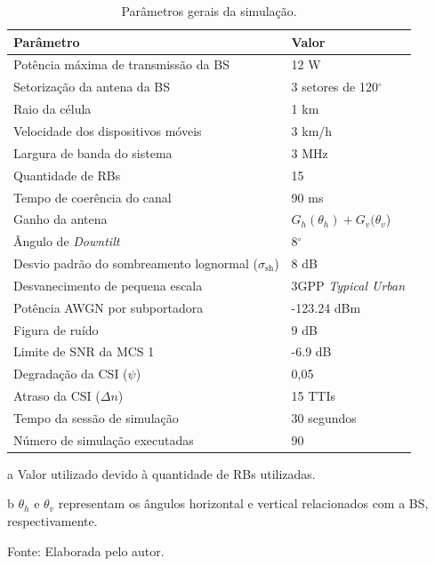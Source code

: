 \renewcommand{\arraystretch}{1}
\begin{table}[!ht]
	\centering
	\begin{threeparttable}[t]
		\caption{Parâmetros gerais da simulação.}
		\label{Tab:Gen_Simul_Param}
		\centering
		\tiny
		\begin{tabular}{l l}
			\toprule
			\textbf{Parâmetro} & \textbf{Valor}\\
			\midrule
			Potência máxima de transmissão da BS\tnote{a} & 12 W \cite{3gpp.36.814}\\
			\midrule
			Setorização da antena da BS & 3 setores de 120$^{\circ}$ \cite{3gpp.36.814}\\
			\midrule
			Raio da célula & 1 km\\
			\midrule
			Velocidade dos dispositivos móveis & 3 km/h \cite{3gpp.25.814}\\
			\midrule
			Largura de banda do sistema & 3 MHz \cite{Book:Pelcat2013}\\
			\midrule
			Quantidade de RBs & 15 \cite{Book:Pelcat2013}\\
			\midrule
			Tempo de coerência do canal & 90 ms\\
			\midrule
			Ganho da antena\tnote{b} & $G_{h}(\theta_{h}) + G_{v}(\theta_{v}$) \cite{Gunnarsson2008}\\
			\midrule
			Ângulo de \textit{Downtilt} & 8$^{\circ}$\\
			\midrule
			Desvio padrão do sombreamento lognormal ($\sigma_{\mathrm{sh}}$) & 8 dB \cite{3gpp.25.814}\\
			\midrule
			Desvanecimento de pequena escala & 3GPP \textit{Typical Urban} \cite{3gpp.25.943}\\
			\midrule
			Potência AWGN por subportadora & -123.24 dBm\\
			\midrule
			Figura de ruído & 9 dB\\
			\midrule
			Limite de SNR da MCS 1 & -6.9 dB \cite{EUSIPCO2009}\\
			\midrule
			Degradação da CSI ($\psi$) & 0,05\\
			\midrule
			Atraso da CSI ($\Delta n$) & 15 TTIs\\
			\midrule
			Tempo da sessão de simulação & 30 segundos\\
			\midrule
			Número de simulação executadas & 90 \\
			\bottomrule
		\end{tabular}
		\begin{tablenotes}
			\item [a] Valor utilizado devido à quantidade de RBs utilizadas.
			\item [b] $\theta_{h}$ e $\theta_{v}$ representam os ângulos horizontal e vertical relacionados com a BS, respectivamente.
		\end{tablenotes}
		{Fonte: Elaborada pelo autor.}
	\end{threeparttable}
\end{table}

